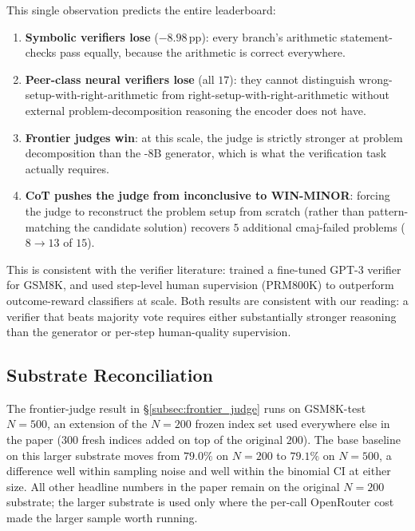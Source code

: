 This single observation predicts the entire leaderboard:

\begin{enumerate}
    \item \textbf{Symbolic verifiers lose} ($-8.98$\,pp): every
          branch's arithmetic statement-checks pass equally,
          because the arithmetic is correct everywhere.
    \item \textbf{Peer-class neural verifiers lose} (all $17$):
          they cannot distinguish wrong-setup-with-right-arithmetic
          from right-setup-with-right-arithmetic without external
          problem-decomposition reasoning the encoder does not
          have.
    \item \textbf{Frontier judges win}: at this scale, the judge
          is strictly stronger at problem decomposition than the
          \LLaDA{}-$8$B generator, which is what the verification
          task actually requires.
    \item \textbf{CoT pushes the judge from inconclusive to
          WIN-MINOR}: forcing the judge to reconstruct the problem
          setup from scratch (rather than pattern-matching the
          candidate solution) recovers $5$ additional cmaj-failed
          problems ($8 \to 13$ of $15$).
\end{enumerate}

This is consistent with the verifier literature: \citet{cobbe2021verifier}
trained a fine-tuned GPT-3 verifier for GSM8K, and
\citet{lightman2023letsverify} used step-level human supervision
(PRM800K) to outperform outcome-reward classifiers at scale.  Both
results are consistent with our reading: a verifier that beats
majority vote requires either substantially stronger reasoning than
the generator or per-step human-quality supervision.

\subsection{Substrate Reconciliation}
\label{subsec:substrate_reconciliation}

The frontier-judge result in \S\ref{subsec:frontier_judge} runs on
GSM8K-test $N{=}500$, an extension of the $N{=}200$ frozen index set
used everywhere else in the paper ($300$ fresh indices added on top
of the original $200$).  The base \cmaj{} baseline on this larger
substrate moves from $79.0\%$ on $N{=}200$ to $79.1\%$ on $N{=}500$,
a difference well within sampling noise and well within the binomial
CI at either size.  All other headline numbers in the paper remain
on the original $N{=}200$ substrate; the larger substrate is used
only where the per-call OpenRouter cost made the larger sample
worth running.

